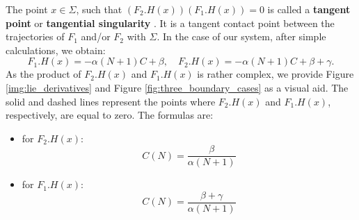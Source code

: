 \documentclass[12pt,a4paper]{article}
\begin{document}
The point $x \in \Sigma$, such that $(F_2.H(x))(F_1.H(x)) = 0$ is called a \textbf{tangent point} or \textbf{tangential singularity} \cite{buzzi2018poincare} \cite{bernardo2008piecewise}. It is a tangent contact point between the trajectories of $F_1$ and/or $F_2$ with $\Sigma$.
In the case of our system, after simple calculations, we obtain:
\begin{equation}
    F_1.H(x) = -\alpha(N+1)C + \beta, \quad  F_2.H(x) = -\alpha(N+1)C + \beta + \gamma.
\end{equation}
As the product of $F_2.H(x)$ and $F_1.H(x)$ is rather complex, we provide Figure \ref{img:lie_derivatives} and Figure \ref{fig:three_boundary_cases} as a visual aid. The solid and dashed lines represent the points where $F_2.H(x)$ and $F_1.H(x)$, respectively, are equal to zero. The formulas are:
\begin{itemize}
    \item for $F_2.H(x)$:
    \begin{equation}
        C(N) = \frac{\beta}{\alpha(N+1)}
    \end{equation}
    \item for $F_1.H(x)$:
    \begin{equation}
        C(N) = \frac{\beta + \gamma}{\alpha(N+1)}
    \end{equation}
\end{itemize}
\end{document}

